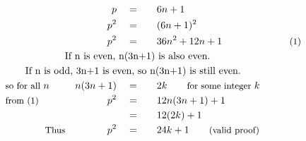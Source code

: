 \begin{alignat*}{5}
&\,&p\quad&=\quad&&6n+1\\
&\,&p^2\quad&=&&(6n+1)^2\\
&\,&p^2\quad&=&&36n^2+12n+1&&\qquad\small\text{(1)}\\
&\qquad\qquad\qquad\rlap{\text{If }n\text{ is even, }n(3n+1)\text{ is also even.}}\\
&\qquad\rlap{\text{If }n\text{ is odd, }3n+1\text{ is even, so }n(3n+1)\text{ is still even.}}\\
&\small\text{so for all }n\normalsize\quad&n(3n+1)\quad&=&&2k\qquad\small\text{for some integer }k\\
&\small\text{from (1)}&p^2\quad&=&&12n(3n+1)+1\\
&\,&\,&=&&12(2k)+1\\
&\qquad\qquad\small\text{Thus}&p^2\quad&=&&24k+1\qquad\small\text{(valid proof)}
\end{alignat*}
